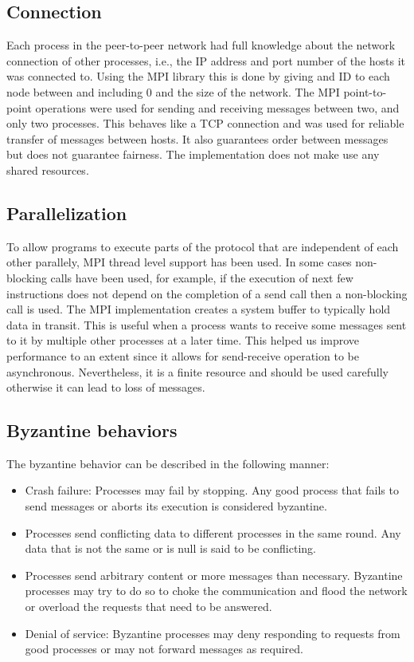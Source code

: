 \subsection{Connection}
Each process in the peer-to-peer network had full knowledge about the network connection of other processes, i.e., the IP address and port number of the hosts it was connected to. Using the MPI library this is done by giving and ID to each node between and including $0$ and the size of the network. The MPI point-to-point operations were used for sending and receiving messages between two, and only two processes. This behaves like a TCP connection and was used for reliable transfer of messages between hosts. It also guarantees order between messages but does not guarantee fairness. The implementation does not make use any shared resources.

\subsection{Parallelization}
To allow programs to execute parts of the protocol that are independent of each other parallely, MPI thread level support has been used. In some cases non-blocking calls have been used, for example, if the execution of next few instructions does not depend on the completion of a send call then a non-blocking call is used. The MPI implementation creates a system buffer to typically hold data in transit. This is useful when a process wants to receive some messages sent to it by multiple other processes at a later time. This helped us improve performance to an extent since it allows for send-receive operation to be asynchronous. Nevertheless, it is a finite resource and should be used carefully otherwise it can lead to loss of messages. 

\subsection{Byzantine behaviors}
The byzantine behavior can be described in the following manner:
\begin{itemize}
    \item Crash failure: Processes may fail by stopping. Any good process that fails to send messages or aborts its execution is considered byzantine.
    \item Processes send conflicting data to different processes in the same round. Any data that is not the same or is null is said to be conflicting.
    \item Processes send arbitrary content or more messages than necessary. Byzantine processes may try to do so to choke the communication and flood the network or overload the requests that need to be answered.
    \item Denial of service: Byzantine processes may deny responding to requests from good processes or may not forward messages as required. 
\end{itemize}

